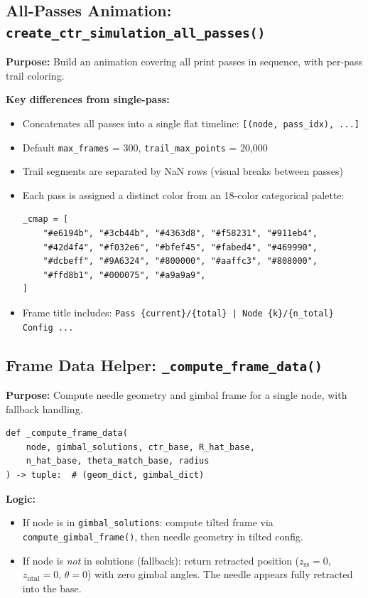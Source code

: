 \documentclass[11pt,a4paper]{article}
\newcommand{\funcname}[1]{\texttt{\textcolor{codepurple}{#1}}}
\newcommand{\param}[1]{\texttt{\textcolor{codegreen}{#1}}}
\begin{document}
\subsection{All-Passes Animation: \funcname{create\_ctr\_simulation\_all\_passes()}}

\textbf{Purpose:} Build an animation covering all print passes in sequence, with per-pass trail coloring.

\textbf{Key differences from single-pass:}
\begin{itemize}[nosep]
    \item Concatenates all passes into a single flat timeline: \texttt{[(node, pass\_idx), ...]}
    \item Default \param{max\_frames} = 300, \param{trail\_max\_points} = 20,000
    \item Trail segments are separated by NaN rows (visual breaks between passes)
    \item Each pass is assigned a distinct color from an 18-color categorical palette:

\begin{lstlisting}[numbers=none]
_cmap = [
    "#e6194b", "#3cb44b", "#4363d8", "#f58231", "#911eb4",
    "#42d4f4", "#f032e6", "#bfef45", "#fabed4", "#469990",
    "#dcbeff", "#9A6324", "#800000", "#aaffc3", "#808000",
    "#ffd8b1", "#000075", "#a9a9a9",
]
\end{lstlisting}

    \item Frame title includes: \texttt{Pass \{current\}/\{total\} | Node \{k\}/\{n\_total\} Config ...}
\end{itemize}

\subsection{Frame Data Helper: \funcname{\_compute\_frame\_data()}}

\textbf{Purpose:} Compute needle geometry and gimbal frame for a single node, with fallback handling.

\begin{lstlisting}
def _compute_frame_data(
    node, gimbal_solutions, ctr_base, R_hat_base,
    n_hat_base, theta_match_base, radius
) -> tuple:  # (geom_dict, gimbal_dict)
\end{lstlisting}

\textbf{Logic:}
\begin{itemize}[nosep]
    \item If node is in \texttt{gimbal\_solutions}: compute tilted frame via \funcname{compute\_gimbal\_frame()}, then needle geometry in tilted config.
    \item If node is \emph{not} in solutions (fallback): return retracted position ($z_\text{ss}=0$, $z_\text{ntnl}=0$, $\theta=0$) with zero gimbal angles. The needle appears fully retracted into the base.
\end{itemize}
\end{document}
